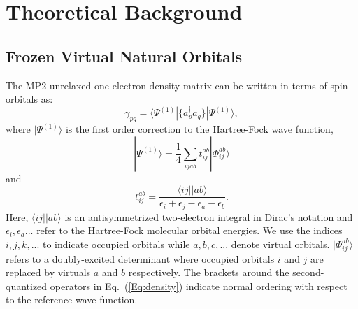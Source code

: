 \documentclass[journal=jpccck,manuscript=article]{achemso}
\begin{document}
\section{Theoretical Background}

\subsection{Frozen Virtual Natural Orbitals}

The MP2 unrelaxed one-electron density matrix can be written in terms of
spin orbitals as: 
\begin{equation}
\gamma_{pq} = \langle \Psi^{(1)}|\{ a^{\dagger}_{p}a_q\}|\Psi^{(1)}\rangle,
\label{Eq:density}
\end{equation}
where $|\Psi^{(1)}\rangle$ is the first order correction to the Hartree-Fock
wave function,
\begin{equation}
|\Psi^{(1)}\rangle = \frac{1}{4}\sum_{ijab} t^{ab}_{ij}|\Phi^{ab}_{ij}\rangle
\end{equation}
and
\begin{equation}
t^{ab}_{ij} = \frac{\langle ij||ab\rangle}{\epsilon_i + \epsilon_j -
\epsilon_a - \epsilon_b}.
\end{equation}
Here, $\langle ij||ab\rangle$ is an antisymmetrized two-electron integral in
Dirac's notation and $\epsilon_i,\epsilon_a...$ refer to the Hartree-Fock
molecular orbital energies. We use the indices $i,j,k,...$ to indicate occupied
orbitals while $a,b,c,...$ denote virtual orbitals. $|\Phi^{ab}_{ij}\rangle$
refers to a doubly-excited determinant where occupied orbitals $i$ and $j$ are
replaced by virtuals $a$ and $b$ respectively.  The brackets around the
second-quantized operators in Eq.~(\ref{Eq:density}) indicate normal ordering
with respect to the reference wave function.
\end{document}
